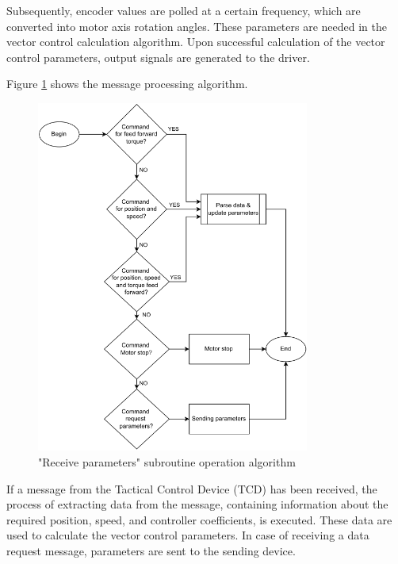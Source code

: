 Subsequently, encoder values are polled at a certain frequency, which are converted into motor axis rotation angles. These parameters are needed in the vector control calculation algorithm. Upon successful calculation of the vector control parameters, output signals are generated to the driver.

Figure \ref{AlgRecive} shows the message processing algorithm. 
\begin{figure}[H]
	\centering
	\includegraphics[width=0.8\textwidth]{Src/images/Receive parameters.png}
	\caption{"Receive parameters" subroutine operation algorithm}
	\label{AlgRecive}
\end{figure}

If a message from the Tactical Control Device (TCD) has been received, the process of extracting data from the message, containing information about the required position, speed, and controller coefficients, is executed. These data are used to calculate the vector control parameters. In case of receiving a data request message, parameters are sent to the sending device.
